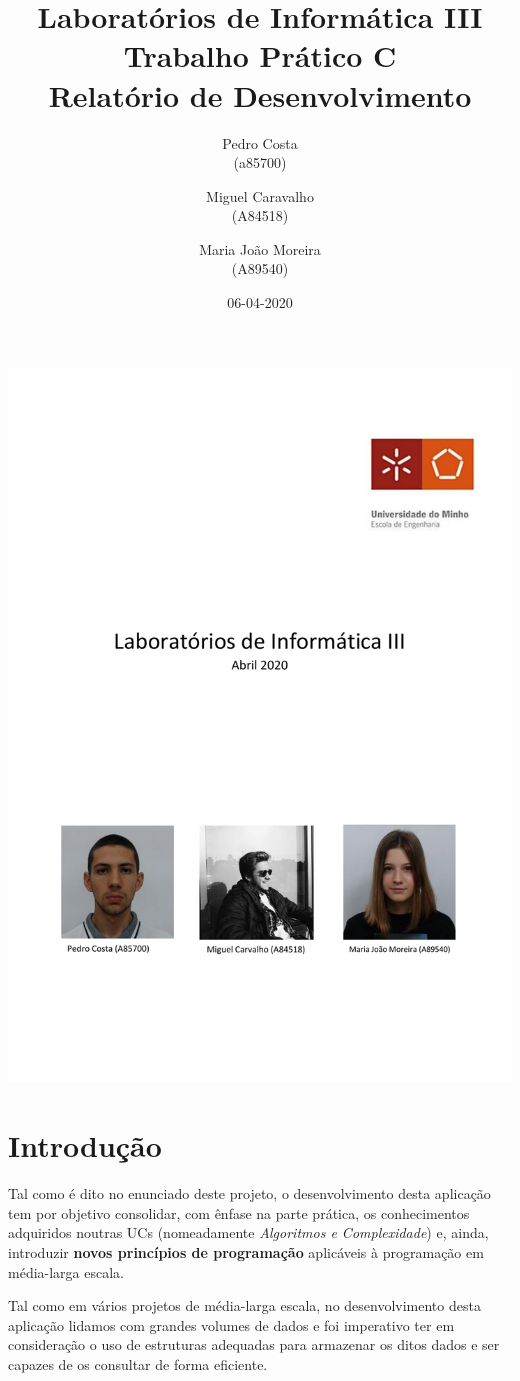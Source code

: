 \documentclass[11pt]{article}
\title{Laboratórios de Informática III \\
       \textbf{Trabalho Prático C}\\ Relatório de Desenvolvimento
       } %
\author{Pedro Costa\\ (a85700) \and Miguel Caravalho\\ (A84518)
         \and Maria João Moreira\\ (A89540)
       } %
\date{06-04-2020} %
\begin{document}
\begin{titlepage}
    \includegraphics[width=\columnwidth]{images/capa.pdf}
\end{titlepage}
\newpage

\newpage
\tableofcontents %

\newpage
\section{Introdução}
Tal como é dito no enunciado deste projeto, o desenvolvimento desta aplicação tem por objetivo consolidar, com ênfase na parte prática, os conhecimentos adquiridos noutras UCs (nomeadamente \textit{Algoritmos e Complexidade}) e, ainda, introduzir \textbf{novos princípios de programação} aplicáveis à programação em média-larga escala.

Tal como em vários projetos de média-larga escala, no desenvolvimento desta aplicação lidamos com grandes volumes de dados e foi imperativo ter em consideração o uso de estruturas adequadas para armazenar os ditos dados e ser capazes de os consultar de forma eficiente.
\end{document}
